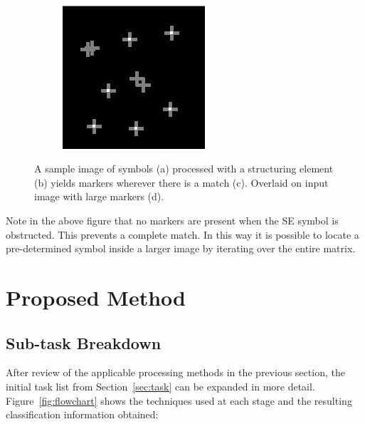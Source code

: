 \documentclass[a4paper,12pt,notitlepage]{article}
\begin{document}
\begin{figure}[H]
\begin{subfigure}[b]{0.3\textwidth}
					\caption{}
				\end{subfigure}\\
				\begin{subfigure}[b]{0.3\textwidth}
					\centering
					\includegraphics[width=\textwidth]{chris/image15}
					\caption{}
				\end{subfigure}
				\caption{A sample image of symbols (a) processed with a structuring element (b) yields markers wherever there is a match (c). Overlaid on input image with large markers (d).}
				\label{fig:hom}
			\end{figure}

			Note in the above figure that no markers are present when the SE symbol is obstructed. This prevents a complete match. In this way it is possible to locate a pre-determined symbol inside a larger image by iterating over the entire matrix.
\pagebreak
\section{Proposed Method}
	\subsection{Sub-task Breakdown}
		After review of the applicable processing methods in the previous section, the initial task list from Section~\ref{sec:task} can be expanded in more detail. Figure~\ref{fig:flowchart} shows the techniques used at each stage and the resulting classification information obtained:
\end{document}
